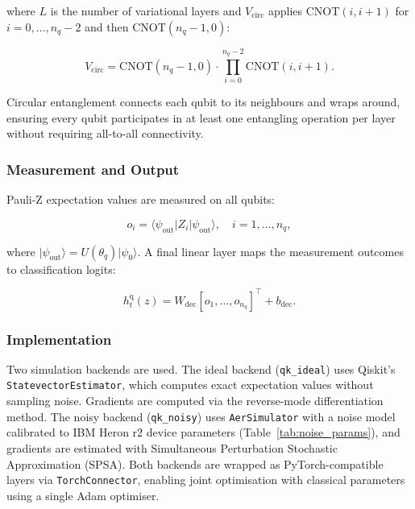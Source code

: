 \documentclass[acmlarge]{acmart}
\begin{document}
where $L$ is the number of variational layers and $V_{\text{circ}}$ applies $\mathrm{CNOT}(i, i+1)$ for $i = 0, \ldots, n_q-2$ and then $\mathrm{CNOT}(n_q-1, 0)$:

\begin{equation}
\label{eq:circular}
V_{\text{circ}} = \mathrm{CNOT}(n_q-1, 0) \cdot \prod_{i=0}^{n_q-2} \mathrm{CNOT}(i, i+1).
\end{equation}

Circular entanglement connects each qubit to its neighbours and wraps around, ensuring every qubit participates in at least one entangling operation per layer without requiring all-to-all connectivity.

\subsubsection{Measurement and Output}

Pauli-Z expectation values are measured on all qubits:

\begin{equation}
\label{eq:measurement}
o_i = \langle \psi_{\text{out}} \vert Z_i \vert \psi_{\text{out}} \rangle, \quad i = 1, \ldots, n_q,
\end{equation}

where $\vert \psi_{\text{out}} \rangle = U(\theta_q) \vert \psi_0 \rangle$.
A final linear layer maps the measurement outcomes to classification logits:

\begin{equation}
\label{eq:q_output}
h_t^{\text{q}}(z) = W_{\text{dec}} [o_1, \ldots, o_{n_q}]^\top + b_{\text{dec}}.
\end{equation}

\subsubsection{Implementation}

Two simulation backends are used.
The ideal backend (\texttt{qk\_ideal}) uses Qiskit's \texttt{StatevectorEstimator}, which computes exact expectation values without sampling noise.
Gradients are computed via the reverse-mode differentiation method.
The noisy backend (\texttt{qk\_noisy}) uses \texttt{AerSimulator} with a noise model calibrated to IBM Heron r2 device parameters (Table~\ref{tab:noise_params}), and gradients are estimated with Simultaneous Perturbation Stochastic Approximation (SPSA).
Both backends are wrapped as PyTorch-compatible layers via \texttt{TorchConnector}, enabling joint optimisation with classical parameters using a single Adam optimiser.
\end{document}
